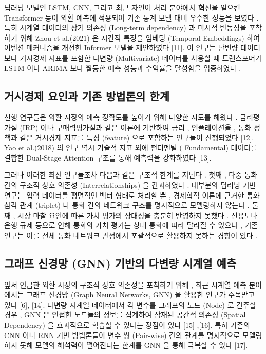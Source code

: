 \documentclass[10pt,a4paper]{article}
\begin{document}
딥러닝 모델인 LSTM, CNN, 그리고 최근 자연어 처리 분야에서 혁신을 일으킨 Transformer 등이 외환 예측에 적용되어 기존 통계 모델 대비 우수한 성능을 보였다 . 특히 시계열 데이터의 장기 의존성 (Long-term dependency) 과 미시적 변동성을 포착하기 위해 Zhou et al.(2021) 은 시간적 특징을 임베딩 (Temporal Embeddings) 하여 어텐션 메커니즘을 개선한 Informer 모델을 제안하였다 [11]. 이 연구는 단변량 데이터보다 거시경제 지표를 포함한 다변량 (Multivariate) 데이터를 사용할 때 트랜스포머가 LSTM 이나 ARIMA 보다 월등한 예측 성능과 수익률을 달성함을 입증하였다 .

\subsection{거시경제 요인과 기존 방법론의 한계}
선행 연구들은 외환 시장의 예측 정확도를 높이기 위해 다양한 시도를 해왔다 . 금리평가설 (IRP) 이나 구매력평가설과 같은 이론에 기반하여 금리 , 인플레이션율 , 통화 정책과 같은 거시경제 지표를 특징 (feature) 으로 포함하는 연구들이 진행되었다 [12]. Yao et al.(2018) 의 연구 역시 기술적 지표 외에 펀더멘털 ( Fundamental) 데이터를 결합한 Dual-Stage Attention 구조를 통해 예측력을 강화하였다 [13].

그러나 이러한 최신 연구들조차 다음과 같은 구조적 한계를 지닌다 . 첫째 , 다중 통화 간의 구조적 상호 의존성 (Interrelationships) 을 간과하였다 . 대부분의 딥러닝 기반 연구는 입력 데이터를 평면적인 벡터 형태로 처리할 뿐 , 경제학적 이론에 근거한 통화 삼각 관계 (triplet) 나 통화 간의 네트워크 구조를 명시적으로 모델링하지 않는다 . 둘째 , 시장 마찰 요인에 따른 가치 평가의 상대성을 충분히 반영하지 못했다 . 신용도나 은행 규제 등으로 인해 통화의 가치 평가는 상대 통화에 따라 달라질 수 있으나 , 기존 연구는 이를 전체 통화 네트워크 관점에서 포괄적으로 활용하지 못하는 경향이 있다 .

\subsection{그래프 신경망 (GNN) 기반의 다변량 시계열 예측}
앞서 언급한 외환 시장의 구조적 상호 의존성을 포착하기 위해 , 최근 시계열 예측 분야에서는 그래프 신경망 (Graph Neural Networks, GNN) 을 활용한 연구가 주목받고 있다 [6], [14]. 다변량 시계열 데이터에서 각 변수를 그래프의 노드 (Node) 로 간주할 경우 , GNN 은 인접한 노드들의 정보를 집계하여 잠재된 공간적 의존성 (Spatial Dependency) 을 효과적으로 학습할 수 있다는 장점이 있다 [15] ,[16]. 특히 기존의 CNN 이나 RNN 기반 방법론들이 변수 쌍 (Pair-wise) 간의 관계를 명시적으로 모델링하지 못해 모델의 해석력이 떨어진다는 한계를 GNN 을 통해 극복할 수 있다 [17].
\end{document}
